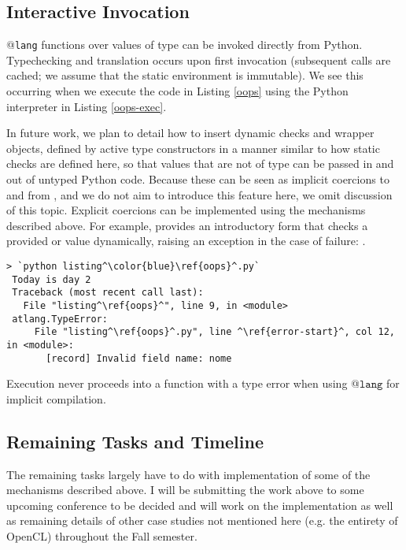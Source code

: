 \subsection{Interactive Invocation} @\texttt{lang} functions over values of type  can be invoked directly from Python. Typechecking and translation occurs upon first invocation (subsequent calls are cached; we assume that the static environment is immutable). We see this occurring when we execute the code in Listing \ref{oops} using the Python interpreter in Listing \ref{oops-exec}. 

In future work, we plan to detail how to insert dynamic checks and wrapper objects, defined by active type constructors in a manner similar to how static checks are defined here, so that values that are not of type  can be passed in and out of untyped Python code. Because these can be seen as implicit coercions to and from , and we do not aim to introduce this feature here, we omit discussion of this topic. Explicit coercions can be implemented using the mechanisms described above. For example,  provides an introductory form that checks a provided   or  value dynamically, raising an exception in the case of failure: .

\begin{codelisting}[h]
\begin{lstlisting}[style=Bash]
> `python listing^\color{blue}\ref{oops}^.py`
 Today is day 2
 Traceback (most recent call last):
   File "listing^\ref{oops}^", line 9, in <module>
 atlang.TypeError: 
     File "listing^\ref{oops}^.py", line ^\ref{error-start}^, col 12, in <module>: 
       [record] Invalid field name: nome
\end{lstlisting}
\caption{Execution never proceeds into a function with a type error when using @$\texttt{lang}$ for implicit compilation.}
\label{oops-exec}
\end{codelisting}

\subsection{Remaining Tasks and Timeline}
The remaining tasks largely have to do with implementation of some of the mechanisms described above. I will be submitting the work above to some upcoming conference to be decided and will work on the implementation as well as remaining details of other case studies not mentioned here (e.g. the entirety of OpenCL) throughout the Fall semester. %

